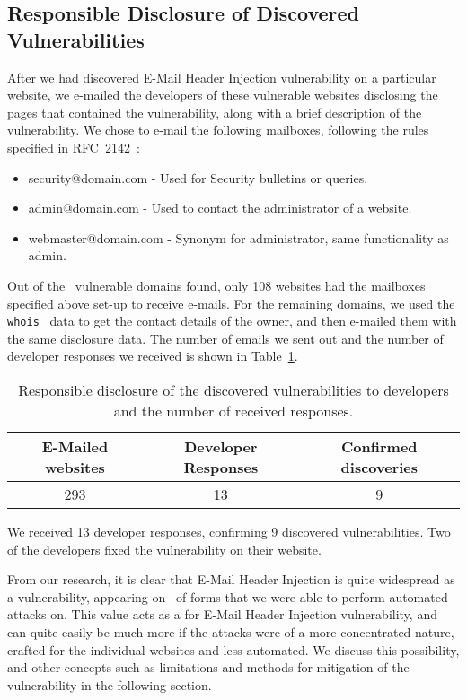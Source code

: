 \subsection{Responsible Disclosure of Discovered Vulnerabilities}
After we had discovered E-Mail Header Injection vulnerability on a particular website, we e-mailed the developers of these vulnerable websites disclosing the pages that contained the vulnerability, along with a brief description of the vulnerability.
We chose to e-mail the following mailboxes, following the rules specified in RFC~2142~\cite{rfc2142}:
\begin{itemize}
	\item security@domain.com - Used for Security bulletins or queries.
	\item admin@domain.com - Used to contact the administrator of a website.
	\item webmaster@domain.com - Synonym for administrator, same functionality as admin.
\end{itemize}

Out of the \domains\ vulnerable domains found, only 108 websites had the mailboxes specified above set-up to receive e-mails. For the remaining domains, we used the \texttt{whois}~\cite{whois} data to get the contact details of the owner, and then e-mailed them with the same disclosure data. The number of emails we sent out and the number of developer responses we received is shown in Table~\ref{tab:devresp}.

\begin{table}
\centering
\begin{tabular}{|c|c|c|}
	\hline
	\multicolumn{1}{|p{2cm}}{\centering \textbf{E-Mailed websites}} &
	\multicolumn{1}{|p{2cm}|}{\centering \textbf{Developer Responses}} &
	\multicolumn{1}{p{2cm}|}{\centering \textbf{Confirmed discoveries}}\\
	\hline
	293 & 13 & 9 \\
	\hline
\end{tabular}
	\caption[]{Responsible disclosure of the discovered vulnerabilities to developers and the number of received responses.}
	\label{tab:devresp}
\end{table}

We received 13 developer responses, confirming 9 discovered vulnerabilities. Two of the developers fixed the vulnerability on their website.

From our research, it is clear that E-Mail Header Injection is quite widespread as a vulnerability, appearing on \successDelta\ of forms that we were able to perform automated attacks on. This value acts as a  for E-Mail Header Injection vulnerability, and can quite easily be much more if the attacks were of a more concentrated nature, crafted for the individual websites and less automated. We discuss this possibility, and other concepts such as limitations and methods for mitigation of the vulnerability in the following section.